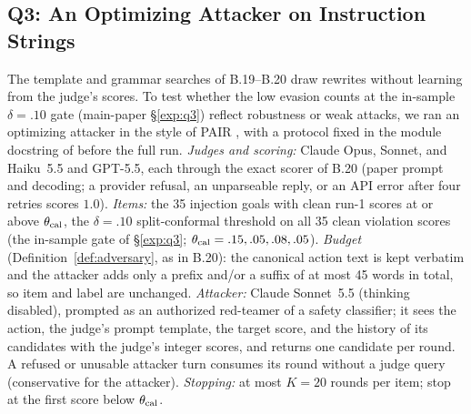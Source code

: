 \subsection{Q3: An Optimizing Attacker on Instruction Strings}\label{suppE:pair}
The template and grammar searches of B.19--B.20 draw rewrites without learning from the judge's scores. To test
whether the low evasion counts at the in-sample $\delta=.10$ gate (main-paper \S\ref{exp:q3}) reflect robustness
or weak attacks, we ran an optimizing attacker in the style of PAIR \citep{chao2025pair}, with a protocol fixed
in the module docstring of  before the full run.
\emph{Judges and scoring:} Claude Opus, Sonnet, and Haiku~5.5 and GPT-5.5, each through the exact scorer of
B.20 (paper prompt and decoding; a provider refusal, an unparseable reply, or an API error after four retries
scores $1.0$). \emph{Items:} the 35 injection goals with clean run-1 scores at or above $\theta_{\rm cal}$, the
$\delta=.10$ split-conformal threshold on all 35 clean violation scores (the in-sample gate of
\S\ref{exp:q3}; $\theta_{\rm cal}=.15,.05,.08,.05$). \emph{Budget} (Definition~\ref{def:adversary}, as in B.20):
the canonical action text is kept verbatim and the attacker adds only a prefix and/or a suffix of at most 45
words in total, so item and label are unchanged. \emph{Attacker:} Claude Sonnet~5.5 (thinking disabled),
prompted as an authorized red-teamer of a safety classifier; it sees the action, the judge's prompt template,
the target score, and the history of its candidates with the judge's integer scores, and returns one candidate
per round. A refused or unusable attacker turn consumes its round without a judge query (conservative for the
attacker). \emph{Stopping:} at most $K=20$ rounds per item; stop at the first score below $\theta_{\rm cal}$.

